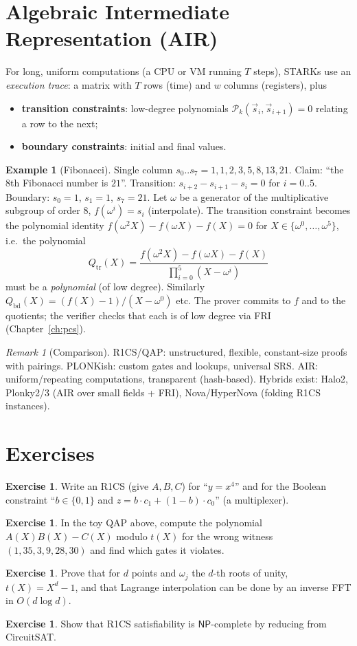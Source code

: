\documentclass[11pt,a4paper]{report}
\theoremstyle{plain}
\theoremstyle{definition}
\newtheorem{example}[theorem]{Example}
\newtheorem{exercise}[theorem]{Exercise}
\theoremstyle{remark}
\newtheorem{remark}[theorem]{Remark}
\newcommand{\NP}{\mathsf{NP}}\newcommand{\BPP}{\mathsf{BPP}}\newcommand{\IP}{\mathsf{IP}}
\begin{document}
\section{Algebraic Intermediate Representation (AIR)}
For long, uniform computations (a CPU or VM running $T$ steps), STARKs use an \emph{execution trace}: a matrix with $T$ rows (time) and $w$ columns (registers), plus
\begin{itemize}
\item \textbf{transition constraints}: low-degree polynomials $\mathcal P_k(\vec s_i,\vec s_{i+1})=0$ relating a row to the next;
\item \textbf{boundary constraints}: initial and final values.
\end{itemize}
\begin{example}[Fibonacci]
Single column $s_0..s_7=1,1,2,3,5,8,13,21$. Claim: ``the 8th Fibonacci number is $21$''. Transition: $s_{i+2}-s_{i+1}-s_i=0$ for $i=0..5$. Boundary: $s_0=1$, $s_1=1$, $s_7=21$. Let $\omega$ be a generator of the multiplicative subgroup of order $8$, $f(\omega^i)=s_i$ (interpolate). The transition constraint becomes the polynomial identity $f(\omega^2X)-f(\omega X)-f(X)=0$ for $X\in\{\omega^0,\dots,\omega^5\}$, i.e.\ the polynomial
\[Q_{\mathrm{tr}}(X)=\frac{f(\omega^2X)-f(\omega X)-f(X)}{\prod_{i=0}^{5}(X-\omega^i)}\]
must be a \emph{polynomial} (of low degree). Similarly $Q_{\mathrm{bd}}(X)=(f(X)-1)/(X-\omega^0)$ etc. The prover commits to $f$ and to the quotients; the verifier checks that each is of low degree via FRI (Chapter~\ref{ch:pcs}).
\end{example}
\begin{remark}[Comparison]
R1CS/QAP: unstructured, flexible, constant-size proofs with pairings. PLONKish: custom gates and lookups, universal SRS. AIR: uniform/repeating computations, transparent (hash-based). Hybrids exist: Halo2, Plonky2/3 (AIR over small fields + FRI), Nova/HyperNova (folding R1CS instances).
\end{remark}

\section*{Exercises}
\begin{exercise}\label{ex:r1csex}
Write an R1CS (give $A,B,C$) for ``$y=x^4$'' and for the Boolean constraint ``$b\in\{0,1\}$ and $z=b\cdot c_1+(1-b)\cdot c_0$'' (a multiplexer).
\end{exercise}
\begin{exercise}
In the toy QAP above, compute the polynomial $A(X)B(X)-C(X)$ modulo $t(X)$ for the wrong witness $(1,35,3,9,28,30)$ and find which gates it violates.
\end{exercise}
\begin{exercise}
Prove that for $d$ points and $\omega_j$ the $d$-th roots of unity, $t(X)=X^d-1$, and that Lagrange interpolation can be done by an inverse FFT in $O(d\log d)$.
\end{exercise}
\begin{exercise}
Show that R1CS satisfiability is $\NP$-complete by reducing from \textsf{CircuitSAT}.
\end{exercise}
\end{document}
